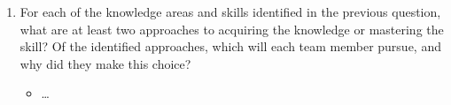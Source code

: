 \begin{enumerate}
	\begin{itemize}
		\item \dots
	\end{itemize}    
  
  \item For each of the knowledge areas and skills identified in the previous
  question, what are at least two approaches to acquiring the knowledge or
  mastering the skill?  Of the identified approaches, which will each team
  member pursue, and why did they make this choice?
  
	\begin{itemize}
		\item \dots
	\end{itemize}    
  
\end{enumerate}